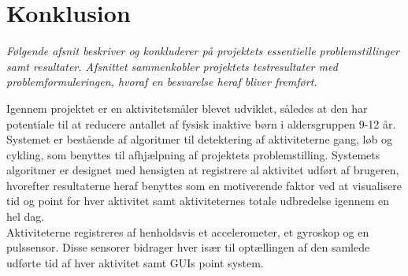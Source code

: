 \section{Konklusion}
\textit{Følgende afsnit beskriver og konkluderer på projektets essentielle problemstillinger samt resultater. Afsnittet sammenkobler projektets testresultater med problemformuleringen, hvoraf en besvarelse heraf bliver fremført.}

Igennem projektet er en aktivitetsmåler blevet udviklet, således at den har potentiale til at reducere antallet af fysisk inaktive børn i aldersgruppen 9-12 år. Systemet er bestående af algoritmer til detektering af aktiviteterne gang, løb og cykling, som benyttes til afhjælpning af projektets problemstilling. Systemets algoritmer er designet med hensigten at registrere al aktivitet udført af brugeren, hvorefter resultaterne heraf benyttes som en motiverende faktor ved at visualisere tid og point for hver aktivitet samt aktiviteternes totale udbredelse igennem en hel dag. \\
Aktiviteterne registreres af henholdsvis et accelerometer, et gyroskop og en pulssensor. Disse sensorer bidrager hver især til optællingen af den samlede udførte tid af hver aktivitet samt GUIs point system. %

